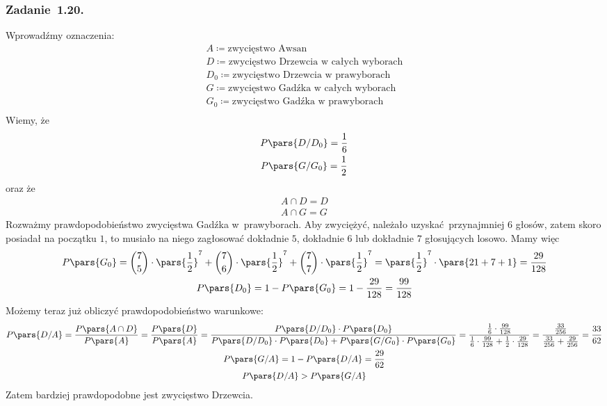 \subsubsection*{Zadanie~1.20.}
Wprowadźmy oznaczenia:
\begin{gather*}
    A \coloneqq \text{zwycięstwo Awsan}\\
    D \coloneqq \text{zwycięstwo Drzewcia w~całych wyborach}\\
    D_0 \coloneqq \text{zwycięstwo Drzewcia w~prawyborach}\\
    G \coloneqq \text{zwycięstwo Gadźka w~całych wyborach}\\
    G_0 \coloneqq \text{zwycięstwo Gadźka w~prawyborach}\\
\end{gather*}
Wiemy, że
\begin{gather*}
    P\pars{D / D_0} = \frac{1}{6}\\
    P\pars{G / G_0} = \frac{1}{2}
\end{gather*}
oraz że
\begin{gather*}
    A \cap D = D\\
    A \cap G = G
\end{gather*}
Rozważmy prawdopodobieństwo zwycięstwa Gadźka w~prawyborach. Aby zwyciężyć, należało uzyskać przynajmniej \(6\) głosów, zatem skoro posiadał na początku \(1\), to musiało na niego zagłosować dokładnie \(5\), dokładnie \(6\) lub dokładnie \(7\) głosujących losowo. Mamy więc
\begin{gather*}
    P\pars{G_0}
    = \binom{7}{5} \cdot \pars{\frac{1}{2}}^7 + \binom{7}{6} \cdot \pars{\frac{1}{2}}^7 + \binom{7}{7} \cdot \pars{\frac{1}{2}}^7
    = \pars{\frac{1}{2}}^7 \cdot \pars{21 + 7 + 1}
    = \frac{29}{128}\\
    P\pars{D_0}
    = 1 - P\pars{G_0}
    = 1 - \frac{29}{128}
    = \frac{99}{128}
\end{gather*}
Możemy teraz już obliczyć prawdopodobieństwo warunkowe:
\begin{gather*}
    P\pars{D / A}
    = \frac{P\pars{A \cap D}}{P\pars{A}}
    = \frac{P\pars{D}}{P\pars{A}}
    = \frac{P\pars{D / D_0} \cdot P\pars{D_0}}{P\pars{D / D_0} \cdot P\pars{D_0} + P\pars{G / G_0} \cdot P\pars{G_0}}
    = \frac{\frac{1}{6} \cdot \frac{99}{128}}{\frac{1}{6} \cdot \frac{99}{128} + \frac{1}{2} \cdot \frac{29}{128}}
    = \frac{\frac{33}{256}}{\frac{33}{256} + \frac{29}{256}}
    = \frac{33}{62}\\
    P\pars{G / A}
    = 1 - P\pars{D / A}
    = \frac{29}{62}\\
    P\pars{D / A} > P\pars{G / A}
\end{gather*}
Zatem bardziej prawdopodobne jest zwycięstwo Drzewcia.

